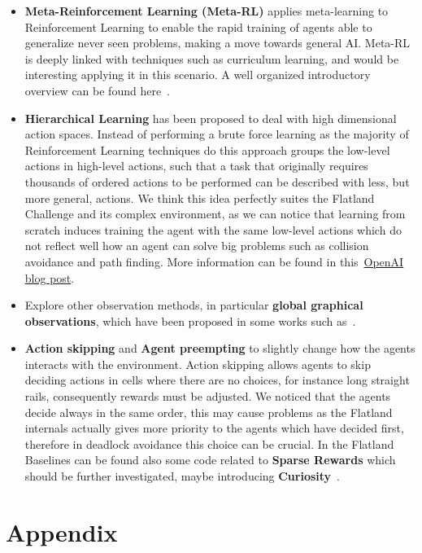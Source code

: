 \documentclass[11pt, a4paper, hidelinks]{report}
\begin{document}
\begin{itemize}
	\item \textbf{Meta-Reinforcement Learning (Meta-RL)} applies meta-learning to Reinforcement Learning to enable the rapid training of agents able to generalize never seen problems, making a move towards general AI\@.
Meta-RL is deeply linked with techniques such as curriculum learning, and would be interesting applying it in this scenario.
A well organized introductory overview can be found here~\citep{weng2019metaRL}.
	\item \textbf{Hierarchical Learning} has been proposed to deal with high dimensional action spaces.
Instead of performing a brute force learning as the majority of Reinforcement Learning techniques do this approach groups the low-level actions in high-level actions, such that a task that originally requires thousands of ordered actions to be performed can be described with less, but more general, actions.
We think this idea perfectly suites the Flatland Challenge and its complex environment, as we can notice that learning from scratch induces training the agent with the same low-level actions which do not reflect well how an agent can solve big problems such as collision avoidance and path finding.
More information can be found in this~\href{https://openai.com/blog/learning-a-hierarchy/}{OpenAI blog post}.
	\item Explore other observation methods, in particular \textbf{global graphical observations}, which have been proposed in some works such as~\citep{Stanford2016MULTIAGENTDR}.
	\item \textbf{Action skipping} and \textbf{Agent preempting} to slightly change how the agents interacts with the environment.
Action skipping allows agents to skip deciding actions in cells where there are no choices, for instance long straight rails, consequently rewards must be adjusted.
We noticed that the agents decide always in the same order, this may cause problems as the Flatland internals actually gives more priority to the agents which have decided first, therefore in deadlock avoidance this choice can be crucial.
In the Flatland Baselines can be found also some code related to \textbf{Sparse Rewards} which should be further investigated, maybe introducing \textbf{Curiosity}~\citep{pathakICMl17curiosity}.
\end{itemize}

\newpage

\appendix
\chapter{Appendix}\label{ch:appendix}
\end{document}
